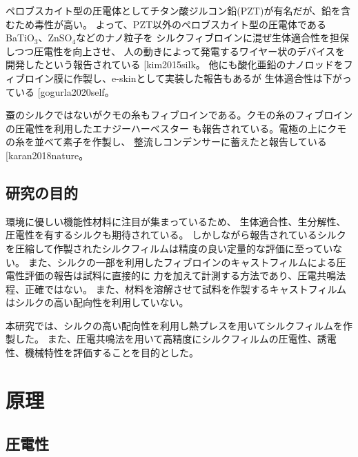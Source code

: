 \documentclass[dvipdfmx,12pt,a4paper]{jreport}
\makeatletter
\DeclareRobustCommand\cite{\unskip
    	\@ifnextchar[{\@tempswatrue\@citex}{\@tempswafalse\@citex[]}}
\makeatother
\begin{document}
			ペロブスカイト型の圧電体としてチタン酸ジルコン鉛(PZT)が有名だが、鉛を含むため毒性が高い。
			よって、PZT以外のペロブスカイト型の圧電体であるBaTiO$_3$、ZnSO$_4$などのナノ粒子を
			シルクフィブロインに混ぜ生体適合性を担保しつつ圧電性を向上させ、
			人の動きによって発電するワイヤー状のデバイスを開発したという報告されている\cite{kim2015silk}。
			他にも酸化亜鉛のナノロッドをフィブロイン膜に作製し、e-skinとして実装した報告もあるが
			生体適合性は下がっている\cite{gogurla2020self}。
			
			蚕のシルクではないがクモの糸もフィブロインである。クモの糸のフィブロインの圧電性を利用したエナジーハーベスター
			も報告されている。電極の上にクモの糸を並べて素子を作製し、
			整流しコンデンサーに蓄えたと報告している\cite{karan2018nature}。
		\section{研究の目的}
		環境に優しい機能性材料に注目が集まっているため、
		生体適合性、生分解性、圧電性を有するシルクも期待されている。
		しかしながら報告されているシルクを圧縮して作製されたシルクフィルムは精度の良い定量的な評価に至っていない。
		また、シルクの一部を利用したフィブロインのキャストフィルムによる圧電性評価の報告は試料に直接的に
		力を加えて計測する方法であり、圧電共鳴法程、正確ではない。
		また、材料を溶解させて試料を作製するキャストフィルムはシルクの高い配向性を利用していない。
		
		本研究では、シルクの高い配向性を利用し熱プレスを用いてシルクフィルムを作製した。
		また、圧電共鳴法を用いて高精度にシルクフィルムの圧電性、誘電性、機械特性を評価することを目的とした。
	\chapter{原理}
		\section{圧電性}
\end{document}
